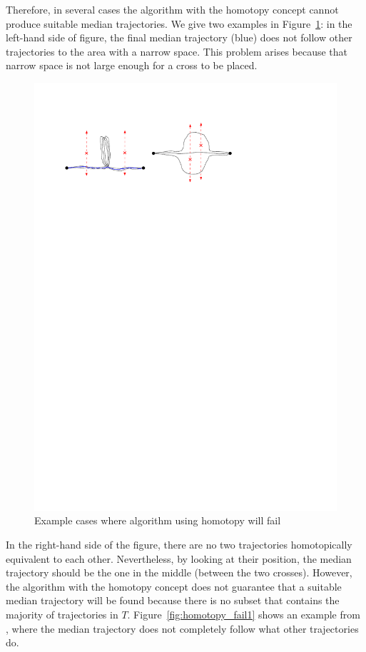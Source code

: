 Therefore, in several cases the algorithm with the homotopy concept cannot produce suitable median trajectories.
We give two examples in Figure~\ref{fig:homotopy_fail0}: in the left-hand side of figure, the final median trajectory (blue) does not follow other trajectories to the area with a narrow space. 
This problem arises because that narrow space is not large enough for a cross to be placed. 

\begin{figure}
\centering
\includegraphics[scale=1]{Gambar/homotopy_fail0}
\caption[Example cases where algorithm using homotopy will fail]{Example cases where algorithm using homotopy will fail} 
\label{fig:homotopy_fail0}
\end{figure}

In the right-hand side of the figure, there are no two trajectories homotopically equivalent to each other. 
Nevertheless, by looking at their position, the median trajectory should be the one in the middle (between the two crosses).
However, the algorithm with the homotopy concept does not guarantee that a suitable median trajectory will be found because there is no subset that contains the majority of trajectories in $T$. 
Figure~\ref{fig:homotopy_fail1} shows an example from \cite{Lionov:2009}, where the median trajectory does not completely follow what other trajectories do.


